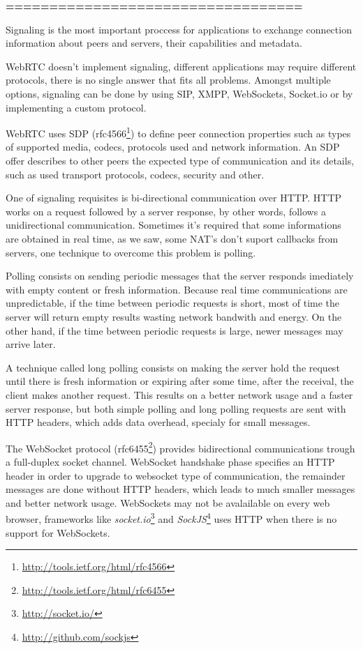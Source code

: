 \textbf{\color{red}==================================}

Signaling is the most important proccess for applications to exchange connection information about peers and servers, their capabilities and metadata.

  \ac{WebRTC} doesn't implement signaling, different applications may require different protocols, there is no single answer that fits all problems. Amongst multiple options, signaling can be done by using \ac{SIP}, \ac{XMPP}, WebSockets, Socket.io or by implementing a custom protocol.

  \ac{WebRTC} uses \ac{SDP} (rfc4566\footnote{\url{http://tools.ietf.org/html/rfc4566}}) to define peer connection properties such as types of supported media, codecs, protocols used and network information. An \ac{SDP} offer describes to other peers the expected type of communication and its details, such as used transport protocols, codecs, security and other.

  One of signaling requisites is bi-directional communication over \ac{HTTP}. \ac{HTTP} works on a request followed by a server response, by other words, follows a unidirectional communication. Sometimes it's required that some informations are obtained in real time, as we saw, some \ac{NAT}'s don't suport callbacks from servers, one technique to overcome this problem is polling.

  Polling consists on sending periodic messages that the server responds imediately with empty content or fresh information. Because real time communications are unpredictable, if the time between periodic requests is short, most of time the server will return empty results wasting network bandwith and energy. On the other hand, if the time between periodic requests is large, newer messages may arrive later.

  A technique called long polling consists on making the server hold the request until there is fresh information or expiring after some time, after the receival, the client makes another request. This results on a better network usage and a faster server response, but both simple polling and long polling requests are sent with \ac{HTTP} headers, which adds data overhead, specialy for small messages.

  The WebSocket protocol (rfc6455\footnote{\url{http://tools.ietf.org/html/rfc6455}}) provides bidirectional communications trough a full-duplex socket channel. WebSocket handshake phase specifies an \ac{HTTP} header in order to upgrade to websocket type of communication, the remainder messages are done without \ac{HTTP} headers, which leads to much smaller messages and better network usage. WebSockets may not be avalailable on every web browser, frameworks like \textit{socket.io}\footnote{\url{http://socket.io/}} and \textit{SockJS}\footnote{\url{http://github.com/sockjs}} uses \ac{HTTP} when there is no support for WebSockets. 

